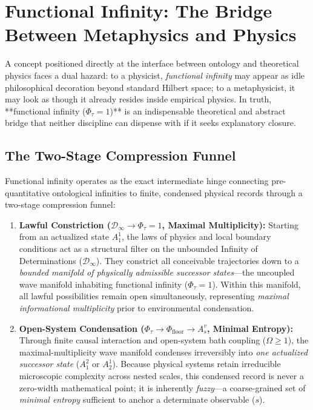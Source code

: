 \documentclass[11pt,a4paper]{article}
\begin{document}
\section{Functional Infinity: The Bridge Between Metaphysics and Physics}

A concept positioned directly at the interface between ontology and theoretical physics faces a dual hazard: to a physicist, \emph{functional infinity} may appear as idle philosophical decoration beyond standard Hilbert space; to a metaphysicist, it may look as though it already resides inside empirical physics. In truth, **functional infinity ($\Phi_\tau = 1$)** is an indispensable theoretical and abstract bridge that neither discipline can dispense with if it seeks explanatory closure.

\subsection{The Two-Stage Compression Funnel}

Functional infinity operates as the exact intermediate hinge connecting pre-quantitative ontological infinities to finite, condensed physical records through a two-stage compression funnel:

\begin{enumerate}[label=\textbf{Stage \arabic*:}]
    \item \textbf{Lawful Constriction ($\mathcal{D}_\infty \to \Phi_\tau = 1$, Maximal Multiplicity):} Starting from an actualized state $A_1^1$, the laws of physics and local boundary conditions act as a structural filter on the unbounded Infinity of Determinations ($\mathcal{D}_\infty$). They constrict all conceivable trajectories down to a \emph{bounded manifold of physically admissible successor states}—the uncoupled wave manifold inhabiting functional infinity ($\Phi_\tau = 1$). Within this manifold, all lawful possibilities remain open simultaneously, representing \emph{maximal informational multiplicity} prior to environmental condensation.
    \item \textbf{Open-System Condensation ($\Phi_\tau \to \Phi_{\mathrm{floor}} \to A_s^v$, Minimal Entropy):} Through finite causal interaction and open-system bath coupling ($\Omega \ge 1$), the maximal-multiplicity wave manifold condenses irreversibly into \emph{one actualized successor state} ($A_1^2$ or $A_2^1$). Because physical systems retain irreducible microscopic complexity across nested scales, this condensed record is never a zero-width mathematical point; it is inherently \emph{fuzzy}—a coarse-grained set of \emph{minimal entropy} sufficient to anchor a determinate observable ($s$).
\end{enumerate}
\end{document}
